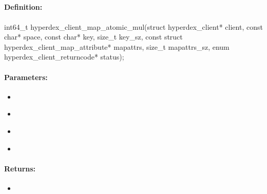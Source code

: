 \pagebreak
\subsection{}
\label{api:c:map_atomic_mul}


\paragraph{Definition:}
\begin{ccode}
int64_t hyperdex_client_map_atomic_mul(struct hyperdex_client* client,
        const char* space,
        const char* key, size_t key_sz,
        const struct hyperdex_client_map_attribute* mapattrs, size_t mapattrs_sz,
        enum hyperdex_client_returncode* status);
\end{ccode}

\paragraph{Parameters:}
\begin{itemize}[noitemsep]
\item {}\\

\item {}\\

\item {}\\

\item {}\\

\end{itemize}

\paragraph{Returns:}
\begin{itemize}[noitemsep]
\item {}\\

\end{itemize}

